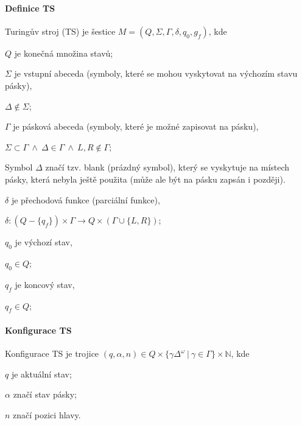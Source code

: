 \paragraph*{Definice TS} Turingův stroj (TS) je šestice $M = (Q, \Sigma, \Gamma, \delta, q_0, g_f)$, kde \begin{compactitem}
    \item $Q$ je konečná množina stavů;

    \item $\Sigma$ je vstupní abeceda (symboly, které se mohou vyskytovat na výchozím stavu pásky), \begin{compactitem}
        \item $\Delta \not\in \Sigma$;
    \end{compactitem}

    \item $\Gamma$ je pásková abeceda (symboly, které je možné zapisovat na pásku), \begin{compactitem}
        \item $\Sigma \subset \Gamma ~\land~ \Delta \in \Gamma ~\land~ L, R \not\in \Gamma$;
        \item Symbol $\Delta$ značí tzv. blank (prázdný symbol), který se vyskytuje na místech pásky,
        která nebyla ještě použita (může ale být na pásku zapsán i později).
    \end{compactitem}

    \item $\delta$ je přechodová funkce (parciální funkce), \begin{compactitem}
        \item $\delta : (Q - \{ q_f \}) \times \Gamma \rightarrow Q \times (\Gamma \cup \{ L, R \})$;
    \end{compactitem}

    \item $q_0$ je výchozí stav, \begin{compactitem}
        \item $q_0 \in Q$;
    \end{compactitem}

    \item $q_f$ je koncový stav, \begin{compactitem}
        \item $q_f \in Q$;
    \end{compactitem}
\end{compactitem}

\paragraph*{Konfigurace TS} Konfigurace TS je trojice $(q, \alpha, n) \in Q \times \{ \gamma \Delta^{\omega} ~|~ \gamma \in \Gamma \} \times \mathbb{N}$, kde \begin{compactitem}
    \item $q$ je aktuální stav;
    \item $\alpha$ značí stav pásky;
    \item $n$ značí pozici hlavy.
\end{compactitem}

